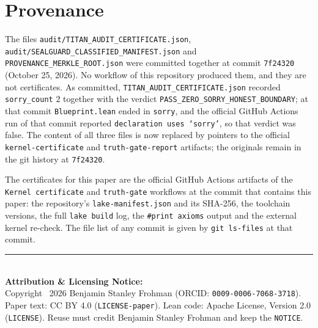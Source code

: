 \documentclass[11pt,a4paper]{article}
\theoremstyle{definition}
\begin{document}
\section{Provenance}
The files \texttt{audit/\allowbreak TITAN\_AUDIT\_CERTIFICATE.json}, \texttt{audit/\allowbreak SEALGUARD\_CLASSIFIED\_MANIFEST.json} and \texttt{PROVENANCE\_\allowbreak MERKLE\_ROOT.json} were committed together at commit \texttt{7f24320} (October 25, 2026). No workflow of this repository produced them, and they are not certificates. As committed, \texttt{TITAN\_AUDIT\_CERTIFICATE.json} recorded \texttt{sorry\_count} $2$ together with the verdict \texttt{PASS\_ZERO\_SORRY\_HONEST\_BOUNDARY}; at that commit \texttt{Blueprint.lean} ended in \texttt{sorry}, and the official GitHub Actions run of that commit reported \texttt{declaration uses `sorry'}, so that verdict was false. The content of all three files is now replaced by pointers to the official \texttt{kernel-certificate} and \texttt{truth-gate-report} artifacts; the originals remain in the git history at \texttt{7f24320}.

The certificates for this paper are the official GitHub Actions artifacts of the \texttt{Kernel certificate} and \texttt{truth-gate} workflows at the commit that contains this paper: the repository's \texttt{lake-manifest.json} and its SHA-256, the toolchain versions, the full \texttt{lake build} log, the \texttt{\#print axioms} output and the external kernel re-check. The file list of any commit is given by \texttt{git ls-files} at that commit.

\vfill
\noindent\rule{\textwidth}{0.4pt}\\
\footnotesize
\textbf{Attribution \& Licensing Notice:}\\
Copyright \textcopyright\ 2026 Benjamin Stanley Frohman (ORCID: \texttt{0009-0006-7068-3718}).\\
Paper text: CC BY 4.0 (\texttt{LICENSE-paper}). Lean code: Apache License, Version 2.0 (\texttt{LICENSE}). Reuse must credit Benjamin Stanley Frohman and keep the \texttt{NOTICE}.
\end{document}
